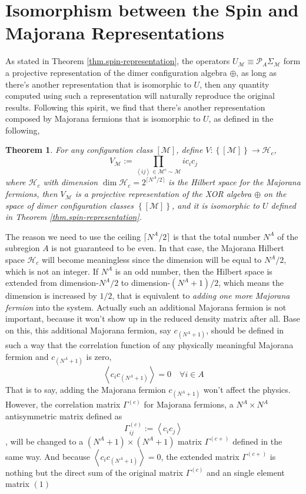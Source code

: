 \documentclass[12font]{article}
\newtheorem{theorem}{Theorem}[section]
\theoremstyle{definition}
\numberwithin{equation}{section}
\newcommand{\anglelr}[1]{\left\langle #1 \right\rangle}
\newcommand{\lrg}[1]{\left\{  #1  \right\}}
\begin{document}
\section{Isomorphism between the Spin and Majorana Representations}
As stated in Theorem \ref{thm.spin-representation}, the operators $U_\mathcal{M}\equiv\mathcal{P}_A\Sigma_\mathcal{M}$ form a projective representation of the dimer configuration algebra $\oplus$, as long as there's another representation that is isomorphic to $U$, then any quantity computed using such a representation will naturally reproduce the original results. Following this spirit, we find that there's another representation composed by Majorana fermions that is isomorphic to $U$, as defined in the following,
\begin{theorem}
  For any configuration class $[\mathcal{M}]$, define $V:\lrg{[\mathcal{M}]}\to \mathcal{H}_c$,
  \[
  V_\mathcal{M} := \prod_{\anglelr{ij}\in\mathcal{M}^c\sim\mathcal{M}}ic_ic_j
  \]
  where $\mathcal{H}_c$ with dimension $\dim\mathcal{H}_c=2^{\lceil N^A/2\rceil}$ is the Hilbert space for the Majorana fermions, then $V_\mathcal{M}$ is a projective representation of the XOR algebra $\oplus$ on the space of dimer configuration classes $\lrg{[\mathcal{M}]}$, and it is isomorphic to $U$ defined in Theorem \ref{thm.spin-representation}.
\end{theorem}
The reason we need to use the ceiling $\lceil N^A/2 \rceil$ is that the total number $N^A$ of the subregion $A$ is not guaranteed to be even. In that case, the Majorana Hilbert space $\mathcal{H}_c$ will become meaningless since the dimension will be equal to $N^A/2$, which is not an integer. If $N^A$ is an odd number, then the Hilbert space is extended from dimension-$N^A/2$ to dimension-$ (N^A+1)/2 $, which means the dimension is increased by $1/2$, that is equivalent to \emph{adding one more Majorana fermion} into the system. Actually such an additional Majorana fermion is not important, because it won't show up in the reduced density matrix after all. Base on this, this additional Majorana fermion, say $c_{(N^A+1)}$, should be defined in such a way that the correlation function of any physically meaningful Majorana fermion and $c_{(N^A+1)}$ is zero, 
\[
\anglelr{c_ic_{(N^A+1)}} = 0  \quad  \forall i\in A
\]
That is to say, adding the Majorana fermion $c_{(N^A+1)}$ won't affect the physics. However, the correlation matrix $\Gamma^{(c)}$ for Majorana fermions, a $N^A\times N^A$ antisymmetric matrix defined as
\[
\Gamma^{(c)}_{ij} := \anglelr{c_ic_j}
\]
, will be changed to a $(N^A+1)\times (N^A+1)$ matrix $\Gamma^{(c+)}$ defined in the same way. And because $\anglelr{c_ic_{(N^A+1)}} = 0$, the extended matrix $\Gamma^{(c+)}$ is nothing but the direct sum of the original matrix $\Gamma^{(c)}$ and an single element matrix $(1)$
\end{document}
